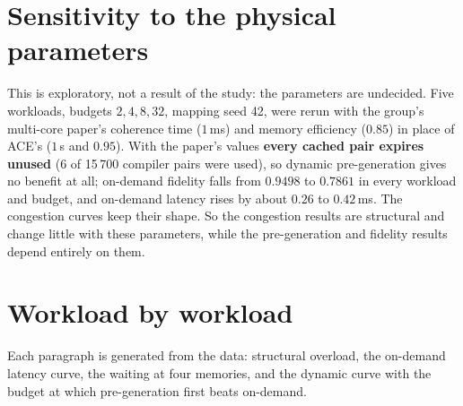 \section{Sensitivity to the physical parameters}
This is exploratory, not a result of the study: the parameters are undecided. Five workloads, budgets $2,4,8,32$, mapping seed 42, were rerun with the group's multi-core paper's coherence time ($1$\,ms) and memory efficiency ($0.85$) in place of ACE's
($1$\,s and $0.95$). With the paper's values \textbf{every cached pair expires unused} (6 of 15\,700 compiler pairs were used), so dynamic pre-generation gives no benefit at all; on-demand fidelity falls from $0.9498$ to $0.7861$ in every workload and
budget, and on-demand latency rises by about $0.26$ to $0.42$\,ms. The congestion curves keep their shape. So the congestion results are structural and change little with these parameters, while the pre-generation and fidelity results depend entirely on them.

\section{Workload by workload}
Each paragraph is generated from the data: structural overload, the on-demand latency curve, the waiting at four memories, and the dynamic curve with the budget at which pre-generation first beats on-demand.

